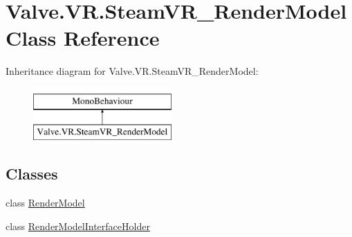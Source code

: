 \hypertarget{class_valve_1_1_v_r_1_1_steam_v_r___render_model}{}\section{Valve.\+V\+R.\+Steam\+V\+R\+\_\+\+Render\+Model Class Reference}
\label{class_valve_1_1_v_r_1_1_steam_v_r___render_model}
Inheritance diagram for Valve.\+V\+R.\+Steam\+V\+R\+\_\+\+Render\+Model\+:\begin{figure}[H]
\begin{center}
\leavevmode
\includegraphics[height=2.000000cm]{class_valve_1_1_v_r_1_1_steam_v_r___render_model}
\end{center}
\end{figure}
\subsection*{Classes}
\begin{DoxyCompactItemize}
\item 
class \mbox{\hyperlink{class_valve_1_1_v_r_1_1_steam_v_r___render_model_1_1_render_model}{Render\+Model}}
\item 
class \mbox{\hyperlink{class_valve_1_1_v_r_1_1_steam_v_r___render_model_1_1_render_model_interface_holder}{Render\+Model\+Interface\+Holder}}
\end{DoxyCompactItemize}
